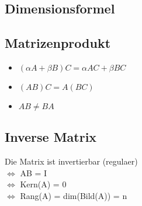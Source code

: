 \documentclass[a4paper,12pt]{article} %
\begin{document}
\subsection{Dimensionsformel}
\begin{center}
\end{center}
\subsection{Matrizenprodukt}
\begin{itemize}
\item $(\alpha A + \beta B)C = \alpha AC + \beta BC$
\item $(AB)C = A(BC)$
\item $AB \neq BA $
\end{itemize}
\newpage
\subsection{Inverse Matrix}
\begin{center}
\end{center}
Die Matrix ist invertierbar (regulaer)\\
$\Leftrightarrow$ AB = I\\
$\Leftrightarrow$ Kern(A) = {0}\\
$\Leftrightarrow$ Rang(A) = dim(Bild(A)) = n
\end{document}
